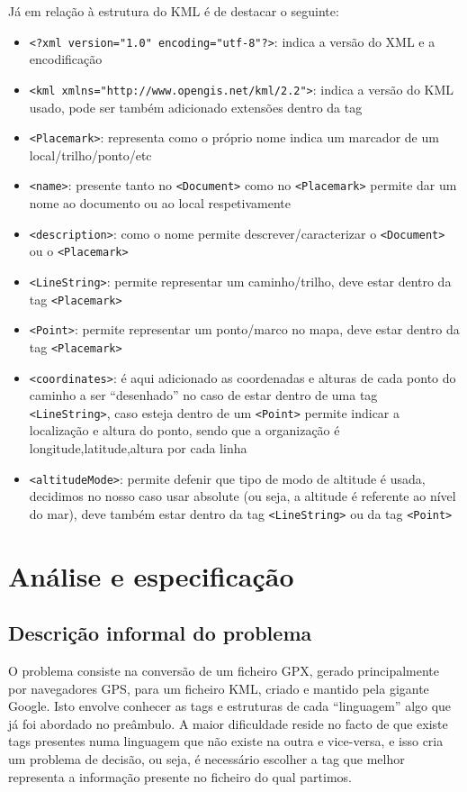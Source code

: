 \documentclass{llncs}
\begin{document}
Já em relação à estrutura do KML é de destacar o seguinte:
\begin{itemize}
    \item \verb|<?xml version="1.0" encoding="utf-8"?>|: indica a versão do XML e a encodificação 
    \item \verb|<kml xmlns="http://www.opengis.net/kml/2.2">|: indica a versão do KML usado, pode ser também adicionado extensões dentro da tag
    \item \verb|<Placemark>|: representa como o próprio nome indica um marcador de um local/trilho/ponto/etc
    \item \verb|<name>|: presente tanto no \verb|<Document>| como no \verb|<Placemark>| permite dar um nome ao documento ou ao local respetivamente
    \item \verb|<description>|: como o nome permite descrever/caracterizar o \verb|<Document>| ou o \verb|<Placemark>|
    \item \verb|<LineString>|: permite representar um caminho/trilho, deve estar dentro da tag \verb|<Placemark>|
    \item \verb|<Point>|: permite representar um ponto/marco no mapa, deve estar dentro da tag \verb|<Placemark>|
    \item \verb|<coordinates>|: é aqui adicionado as coordenadas e alturas de cada ponto do caminho a ser ``desenhado'' no caso de estar dentro de uma tag \verb|<LineString>|, caso esteja dentro de um \verb|<Point>| permite indicar a localização e altura do ponto, sendo que a organização é longitude,latitude,altura por cada linha
    \item \verb|<altitudeMode>|: permite defenir que tipo de modo de altitude é usada, decidimos no nosso caso usar absolute (ou seja, a altitude é referente ao nível do mar), deve também estar dentro da tag \verb|<LineString>| ou da tag \verb|<Point>|
\end{itemize}

\section{Análise e especificação}

\subsection{Descrição informal do problema}
O problema consiste na conversão de um ficheiro GPX, gerado principalmente por navegadores GPS, para um ficheiro KML, criado e mantido pela gigante Google. Isto envolve conhecer as tags e estruturas de cada ``linguagem'' algo que já foi abordado no preâmbulo. A maior dificuldade reside no facto de que existe tags presentes numa linguagem que não existe na outra e vice-versa, e isso cria um problema de decisão, ou seja, é necessário escolher a tag que melhor representa a informação presente no ficheiro do qual partimos.
\end{document}
